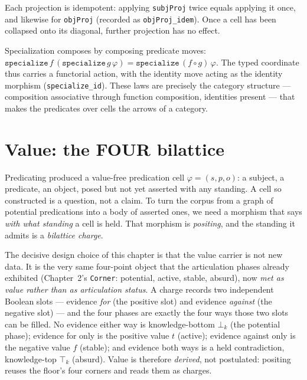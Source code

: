 \begin{proposition}\leanok{}
Each projection is idempotent: applying \texttt{subjProj} twice equals applying it once, and likewise for \texttt{objProj} (recorded as \texttt{objProj\_idem}). Once a cell has been collapsed onto its diagonal, further projection has no effect.
\end{proposition}

\begin{theorem}\leanok{}
Specialization composes by composing predicate moves: $\texttt{specialize}\,f\,(\texttt{specialize}\,g\,\varphi) = \texttt{specialize}\,(f \circ g)\,\varphi$. The typed coordinate thus carries a functorial action, with the identity move acting as the identity morphism (\texttt{specialize\_id}). These laws are precisely the category structure --- composition associative through function composition, identities present --- that makes the predicates over cells the arrows of a category.
\end{theorem}

\chapter{Value: the FOUR bilattice}\label{ch:positing}

Predicating produced a value-free predication cell $\varphi = (s, p, o)$: a subject, a predicate, an object, posed but not yet asserted with any standing. A cell so constructed is a question, not a claim. To turn the corpus from a graph of potential predications into a body of asserted ones, we need a morphism that says \emph{with what standing} a cell is held. That morphism is \emph{positing}, and the standing it admits is a \emph{bilattice charge}.

The decisive design choice of this chapter is that the value carrier is not new data. It is the very same four-point object that the articulation phases already exhibited (Chapter~2's \texttt{Corner}: potential, active, stable, absurd), now \emph{met as value rather than as articulation status}. A charge records two independent Boolean slots --- evidence \emph{for} (the positive slot) and evidence \emph{against} (the negative slot) --- and the four phases are exactly the four ways those two slots can be filled. No evidence either way is knowledge-bottom $\bot_k$ (the potential phase); evidence for only is the positive value $t$ (active); evidence against only is the negative value $f$ (stable); and evidence both ways is a held contradiction, knowledge-top $\top_k$ (absurd). Value is therefore \emph{derived}, not postulated: positing reuses the floor's four corners and reads them as charges.

